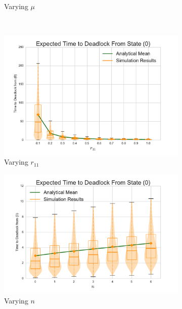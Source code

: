 \documentclass{article}
\begin{document}
\begin{figure}[!htbp]
\begin{center}
\begin{subfigure}[b]{0.35\textwidth}
    \caption{Varying $\mu$}
    \label{fig:1Nms_mu}
  \end{subfigure}\\
  \begin{subfigure}[b]{0.35\textwidth}
    \includegraphics[width=\textwidth]{images/varyr11_1Nms}
    \caption{Varying $r_{11}$}
    \label{fig:1Nms_r11}
  \end{subfigure}
  \begin{subfigure}[b]{0.35\textwidth}
    \includegraphics[width=\textwidth]{images/varyn_1Nms}
    \caption{Varying $n$}
    \label{fig:1Nms_n}
  \end{subfigure}\\
  \begin{subfigure}[b]{0.35\textwidth}

\end{subfigure}
\end{center}
\end{figure}
\end{document}
